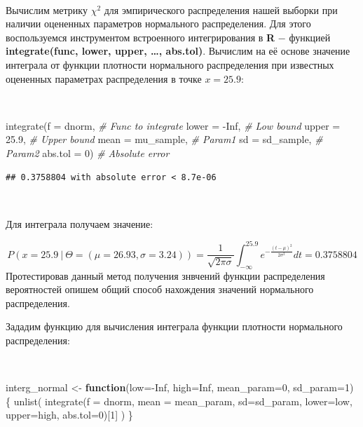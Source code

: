 \documentclass[
  14,
]{article}
\newenvironment{Shaded}{\begin{snugshade}}{\end{snugshade}}
\newcommand{\AttributeTok}[1]{\textcolor[rgb]{0.77,0.63,0.00}{#1}}
\newcommand{\CommentTok}[1]{\textcolor[rgb]{0.56,0.35,0.01}{\textit{#1}}}
\newcommand{\ConstantTok}[1]{\textcolor[rgb]{0.00,0.00,0.00}{#1}}
\newcommand{\ControlFlowTok}[1]{\textcolor[rgb]{0.13,0.29,0.53}{\textbf{#1}}}
\newcommand{\DecValTok}[1]{\textcolor[rgb]{0.00,0.00,0.81}{#1}}
\newcommand{\FloatTok}[1]{\textcolor[rgb]{0.00,0.00,0.81}{#1}}
\newcommand{\FunctionTok}[1]{\textcolor[rgb]{0.00,0.00,0.00}{#1}}
\newcommand{\NormalTok}[1]{#1}
\newcommand{\OtherTok}[1]{\textcolor[rgb]{0.56,0.35,0.01}{#1}}
\newcommand{\SpecialCharTok}[1]{\textcolor[rgb]{0.00,0.00,0.00}{#1}}
\begin{document}
\(\ \)

Вычислим метрику \(\chi^2\) для эмпирического распределения нашей
выборки при наличии оцененных параметров нормального распределения. Для
этого воспользуемся инструментом встроенного интегрирования в \textbf{R}
\(-\) функцией \textbf{integrate(func, lower, upper, \ldots, abs.tol)}.
Вычислим на её основе значение интеграла от функции плотности
нормального распределения при известных оцененных параметрах
распределения в точке \(x = 25.9\):

\(\ \)

\begin{Shaded}
\begin{Highlighting}[]
\FunctionTok{integrate}\NormalTok{(}\AttributeTok{f =}\NormalTok{ dnorm,               }\CommentTok{\# Func to integrate}
          \AttributeTok{lower =} \SpecialCharTok{{-}}\ConstantTok{Inf}\NormalTok{,            }\CommentTok{\# Low bound}
          \AttributeTok{upper =} \FloatTok{25.9}\NormalTok{,            }\CommentTok{\# Upper bound}
          \AttributeTok{mean =}\NormalTok{ mu\_sample,        }\CommentTok{\# Param1}
          \AttributeTok{sd =}\NormalTok{ sd\_sample,          }\CommentTok{\# Param2}
          \AttributeTok{abs.tol =} \DecValTok{0}\NormalTok{)             }\CommentTok{\# Absolute error}
\end{Highlighting}
\end{Shaded}

\begin{verbatim}
## 0.3758804 with absolute error < 8.7e-06
\end{verbatim}

\(\ \)

Для интеграла получаем значение:

\[
P(x = 25.9\ |\ \Theta = (\mu = 26.93, \sigma = 3.24)) = \frac{1}{\sqrt{2\pi \sigma}} \int_{-\infty}^{25.9} e^{-\frac{(t-\mu)^2}{2\sigma^2}}  dt = 0.3758804
\] Протестировав данный метод получения знвчений функции распределения
вероятностей опишем общий способ нахождения значений нормального
распределения.

Зададим функцию для вычисления интеграла функции плотности нормального
распределения:

\(\ \)

\begin{Shaded}
\begin{Highlighting}[]
\NormalTok{interg\_normal }\OtherTok{\textless{}{-}} \ControlFlowTok{function}\NormalTok{(}\AttributeTok{low=}\SpecialCharTok{{-}}\ConstantTok{Inf}\NormalTok{, }\AttributeTok{high=}\ConstantTok{Inf}\NormalTok{, }\AttributeTok{mean\_param=}\DecValTok{0}\NormalTok{, }\AttributeTok{sd\_param=}\DecValTok{1}\NormalTok{) \{}
  \FunctionTok{unlist}\NormalTok{(}
    \FunctionTok{integrate}\NormalTok{(}\AttributeTok{f =}\NormalTok{ dnorm, }
              \AttributeTok{mean =}\NormalTok{ mean\_param, }
              \AttributeTok{sd=}\NormalTok{sd\_param, }
              \AttributeTok{lower=}\NormalTok{low, }
              \AttributeTok{upper=}\NormalTok{high, }
              \AttributeTok{abs.tol=}\DecValTok{0}\NormalTok{)[}\DecValTok{1}\NormalTok{]}
\NormalTok{    )}
\NormalTok{\}}
\end{Highlighting}
\end{Shaded}
\end{document}
